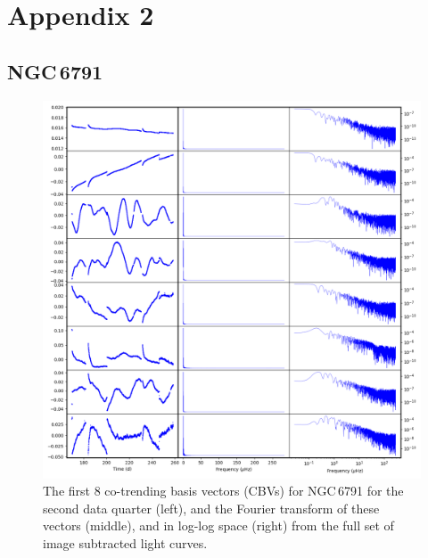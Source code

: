 \chapter{Appendix 2}
\label{app:2}
\newpage

\section*{NGC\,6791}
\begin{figure}[b]
    \centering
    \includegraphics[width=0.9\linewidth]{Chapter_Appended/AppB/cbv_6791_q02.png}
    \caption{The first 8 co-trending basis vectors (CBVs) for NGC\,6791 for the second data quarter (left), and the Fourier transform of these vectors (middle), and in log-log space (right) from the full set of image subtracted light curves.}
    \label{fig:cbvs_allIS_6791_Q2}
\end{figure}


